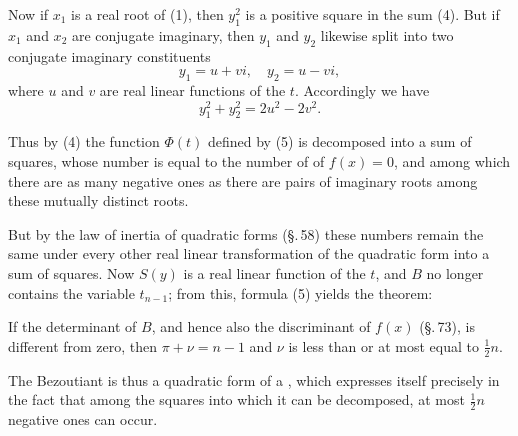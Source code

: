 
Now if $x_1$ is a real root of (1), then $y_1^2$ is a positive square in the sum (4). But if $x_1$ and $x_2$ are conjugate imaginary, then $y_1$ and $y_2$ likewise split into two conjugate imaginary constituents
\[
y_1 = u + vi, \quad y_2 = u - vi,
\]
where $u$ and $v$ are real linear functions of the $t$. Accordingly we have
\[
y_1^2 + y_2^2 = 2u^2 - 2v^2.
\]

Thus by (4) the function $\Phi(t)$ defined by (5) is decomposed into a sum of squares, whose number is equal to the number of  of $f(x) = 0$, and among which there are as many negative ones as there are pairs of imaginary roots among these mutually distinct roots.

But by the law of inertia of quadratic forms (\S.\,58) these numbers remain the same under every other real linear transformation of the quadratic form into a sum of squares. Now $S(y)$ is a real linear function of the $t$, and $B$ no longer contains the variable $t_{n-1}$; from this, formula (5) yields the theorem:


If the determinant of $B$, and hence also the discriminant of $f(x)$ (\S.\,73), is different from zero, then $\pi + \nu = n - 1$ and $\nu$ is less than or at most equal to $\frac{1}{2}n$.

The Bezoutiant is thus a quadratic form of a , which expresses itself precisely in the fact that among the squares into which it can be decomposed, at most $\frac{1}{2}n$ negative ones can occur.
